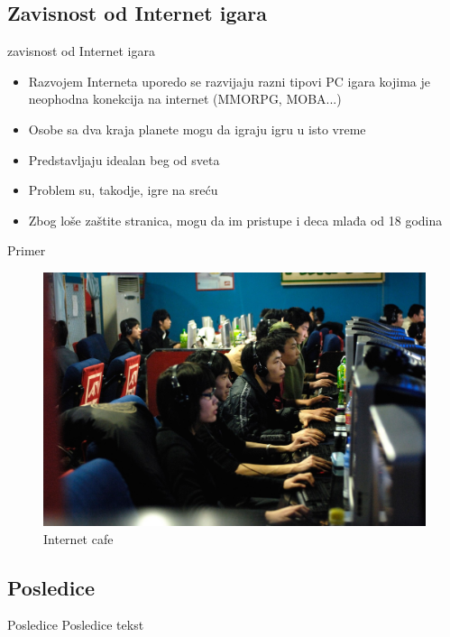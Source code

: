 \documentclass{beamer}
\begin{document}
		\subsection*{Zavisnost od Internet igara}
		\begin{frame}{zavisnost od Internet igara}
		\begin{itemize}

			\item Razvojem Interneta uporedo se razvijaju razni tipovi PC igara kojima je neophodna konekcija na internet (MMORPG, MOBA...)
			\item Osobe sa dva kraja planete mogu da igraju igru u isto vreme
			\item Predstavljaju idealan beg od sveta
			\linebreak
			\item Problem su, takodje, igre na sreću
			\item Zbog loše zaštite stranica, mogu da im pristupe i deca mlađa od 18 godina
		\end{itemize}			
		\end{frame}
		
		\begin{frame}{Primer}
		\begin{figure}[h!]
			\begin{center}
				\includegraphics[scale=0.15]{internet_cafe.jpg}
			\end{center}
			\caption{Internet cafe}
			\label{fig:zavisnost}
		\end{figure}
		
		\end{frame}
		
		\subsection*{Posledice}
		\begin{frame}{Posledice}
			Posledice tekst
		\end{frame}
		
\end{document}
